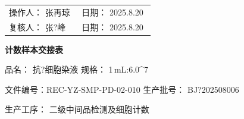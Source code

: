 \documentclass[UTF8,10pt,a4paper,fontset=fandol]{ctexart}
\newcommand{\fieldvalue}[1]{#1}
\newcommand{\handwritten}[1]{#1}
\begin{document}
\vfill

\begin{tabular}{@{}p{0.48\linewidth}p{0.48\linewidth}@{}}
操作人：
\fieldvalue{\handwritten{张再琼}}
&
日期：
\fieldvalue{\handwritten{2025.8.20}}
\\[0.8em]

复核人：
\fieldvalue{\handwritten{张?峰}}
&
日期：
\fieldvalue{\handwritten{2025.8.20}}
\end{tabular}

\newpage

\begin{center}
\textbf{计数样本交接表}
\end{center}

\noindent
品名：
\fieldvalue{\handwritten{抗?细胞染液}}
\hfill
规格：
\fieldvalue{\handwritten{1\,mL:6.0\times10^7}}

\noindent
文件编号：REC-YZ-SMP-PD-02-010
\hfill
生产批号：
\fieldvalue{\handwritten{BJ?202508006}}

\noindent
生产工序：
\fieldvalue{\handwritten{二级中间品检测及细胞计数}}

\bigskip
\end{document}
